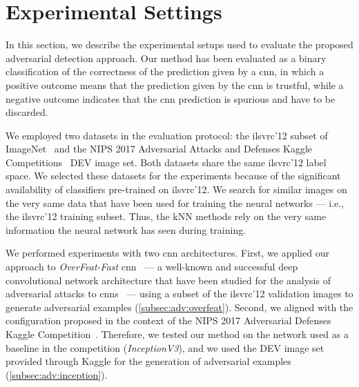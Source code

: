 
\section{Experimental Settings}
\label{sec:adv:experiments}
In this section, we describe the experimental setups used to evaluate the proposed adversarial detection approach.
Our method has been evaluated as a binary classification of the correctness of the prediction given by a \gls{cnn}, in which a positive outcome means that the prediction given by the \gls{cnn} is trustful, while a negative outcome indicates that the \gls{cnn} prediction is spurious and have to be discarded.

We employed two datasets in the evaluation protocol: the \gls{ilsvrc}'12 subset of ImageNet~\cite{russakovsky2015imagenet} and the NIPS 2017 Adversarial Attacks and Defenses Kaggle Competitions~\cite{kurakin2018adversarial} DEV image set.
Both datasets share the same \gls{ilsvrc}'12 label space.
We selected these datasets for the experiments because of the significant availability of classifiers pre-trained on \gls{ilsvrc}'12.
We search for similar images on the very same data that have been used for training the neural networks --- i.e., the \gls{ilsvrc}'12 training subset.
Thus, the kNN methods rely on the very same information the neural network has seen during training.

We performed experiments with two \gls{cnn} architectures.
First, we applied our approach to \emph{OverFeat-Fast} \gls{cnn}~\cite{sermanet2013overfeat} --- a well-known and successful deep convolutional network architecture that have been studied for the analysis of adversarial attacks to \glspl{cnn}~\cite{tabacof2016exploring} --- using a subset of the \gls{ilsvrc}'12 validation images to generate adversarial examples (\ref{subsec:adv:overfeat}).
Second, we aligned with the configuration proposed in the context of the NIPS 2017 Adversarial Defenses Kaggle Competition~\cite{kurakin2018adversarial}.
Therefore, we tested our method on the network used as a baseline in the competition (\emph{InceptionV3}), and we used the DEV image set provided through Kaggle for the generation of adversarial examples (\ref{subsec:adv:inception}).

